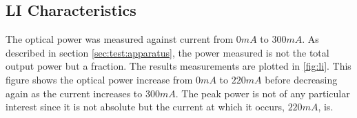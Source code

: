 \subsection{LI Characteristics}
\label{sec:test:li}

%



The optical power was measured against current from $0mA$ to $300mA$. As described in section \ref{sec:test:apparatus}, the power measured is not the total output power but a fraction. The results measurements are plotted in \ref{fig:li}. This figure shows the optical power increase from $0mA$ to $220mA$ before decreasing again as the current increases to $300mA$. The peak power is not of any particular interest since it is not absolute but the current at which it occurs, $220mA$, is.
